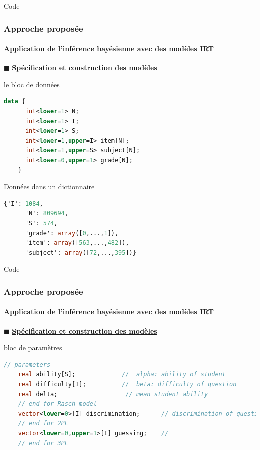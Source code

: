 \documentclass[aspectratio=169,professionalfonts, 12pt]{beamer}
\begin{document}
\begin{frame}{Code}
  \frametitle{Approche proposée}
  \framesubtitle{Application de l'inférence bayésienne avec des modèles IRT}
  \(\displaystyle \blacksquare \) \textbf{\underline{Spécification et construction des modèles}}
  \begin{minipage}{0.48\textwidth}
    \begin{block}{le bloc de données}
    \begin{lstlisting}[language=Stan,basicstyle=\scriptsize,tabsize=1,framesep=0pt,framexleftmargin=0pt,xleftmargin=0pt,xrightmargin=0pt,breakindent=0pt,resetmargins=true]
    data {
      int<lower=1> N;
      int<lower=1> I;
      int<lower=1> S;
      int<lower=1,upper=I> item[N];
      int<lower=1,upper=S> subject[N];
      int<lower=0,upper=1> grade[N];
    }
    \end{lstlisting}
    \end{block}
  \end{minipage}
  \begin{minipage}{1mm}
  \hspace{1mm}
  \end{minipage}
  \begin{minipage}{0.48\textwidth}
    \begin{block}{Données dans un dictionnaire}
    \begin{lstlisting}[language=Stan,basicstyle=\scriptsize,tabsize=1,framesep=0pt,framexleftmargin=0pt,xleftmargin=0pt,xrightmargin=0pt,breakindent=0pt,resetmargins=true]
      {'I': 1084,
      'N': 809694,
      'S': 574,
      'grade': array([0,...,1]),
      'item': array([563,...,482]),
      'subject': array([72,...,395])}
      \end{lstlisting}
    \end{block}
  \end{minipage}	
\end{frame}


\begin{frame}[fragile]{Code}
  \frametitle{Approche proposée}
  \framesubtitle{Application de l'inférence bayésienne avec des modèles IRT}
  \justifying 
  \(\displaystyle \blacksquare \) \textbf{\underline{Spécification et construction des modèles}}
  \begin{minipage}{\textwidth}
  \begin{block}{bloc de paramètres}
    \begin{lstlisting}[language=Stan,basicstyle=\scriptsize,framesep=4.5mm,framexleftmargin=2.5mm,tabsize=2]
    	// parameters
    real ability[S];             //  alpha: ability of student
    real difficulty[I];          //  beta: difficulty of question
    real delta;                   // mean student ability
    // end for Rasch model
    vector<lower=0>[I] discrimination;      // discrimination of question
    // end for 2PL
    vector<lower=0,upper=1>[I] guessing;    //
    // end for 3PL
    \end{lstlisting}
  \end{block}
  \end{minipage}
\end{frame}
\end{document}
